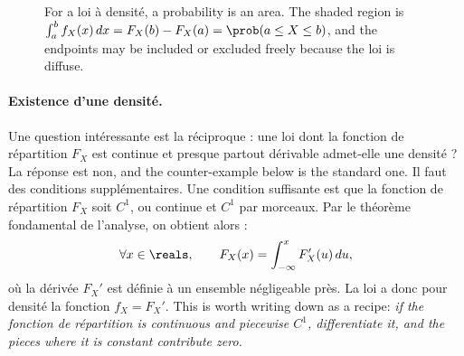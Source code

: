 \begin{figure}[htbp]
  \centering
  \caption{For a loi à densité, a probability is an area. The shaded region
  is $\int_{a}^{b} f_{X}(x)\,dx = F_{X}(b)-F_{X}(a) = \prob(a \leq X \leq b)$,
  and the endpoints may be included or excluded freely because the loi is
  diffuse.}
\end{figure}

\paragraph{Existence d'une densité.}
Une question intéressante est la réciproque : une loi dont la fonction de
répartition $F_{X}$ est continue et presque partout dérivable admet-elle une
densité ? La réponse est non, and the counter-example below is the standard one.
Il faut des conditions supplémentaires. Une condition suffisante est que la
fonction de répartition $F_{X}$ soit $C^{1}$, ou continue et $C^{1}$ par
morceaux. Par le théorème fondamental de l'analyse, on obtient alors :
\[
  \forall x \in \reals, \qquad F_{X}(x) = \int_{-\infty}^{x} F_{X}'(u)\,du ,
\]
où la dérivée $F_{X}'$ est définie à un ensemble négligeable près. La loi a donc
pour densité la fonction $f_{X} = F_{X}'$. This is worth writing down as a recipe:
\emph{if the fonction de répartition is continuous and piecewise $C^{1}$,
differentiate it, and the pieces where it is constant contribute zero.}

